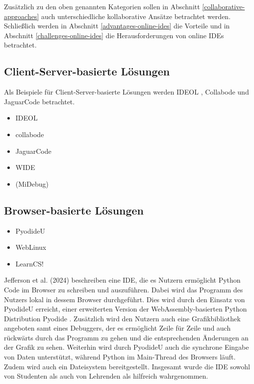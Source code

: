 Zusätzlich zu den oben genannten Kategorien sollen in Abschnitt \ref{collaborative-approaches} auch unterschiedliche kollaborative Ansätze betrachtet werden. Schließlich werden in Abschnitt \ref{advantages-online-ides} die Vorteile und in Abschnitt \ref{challenges-online-ides} die Herausforderungen von online IDEs betrachtet.

\subsection{Client-Server-basierte Lösungen} \label{client-server-based-approaches}

Als Beispiele für Client-Server-basierte Lösungen werden IDEOL \cite{IDEOL-2013}, Collabode \cite{Collabode-2011} und JaguarCode \cite{JaguarCode-2018} betrachtet.

\begin{itemize}
    \item IDEOL
    \item collabode
    \item JaguarCode
    \item WIDE
    \item (MiDebug)
\end{itemize}

\subsection{Browser-basierte Lösungen} \label{browser-based-approaches}

\begin{itemize}
    \item PyodideU
    \item WebLinux
    \item LearnCS!
\end{itemize}

Jefferson et al. (2024) \cite{PyodideU-2024} beschreiben eine IDE, die es Nutzern ermöglicht Python Code im Browser zu schreiben und auszuführen. Dabei wird das Programm des Nutzers lokal in dessem Browser durchgeführt. Dies wird durch den Einsatz von PyodideU erreicht, einer erweiterten Version der WebAssembly-basierten Python Distribution Pyodide \cite{Pyodide}. Zusätzlich wird den Nutzern auch eine Grafikbibliothek angeboten samt eines Debuggers, der es ermöglicht Zeile für Zeile und auch rückwärts durch das Programm zu gehen und die entsprechenden Änderungen an der Grafik zu sehen. Weiterhin wird durch PyodideU auch die synchrone Eingabe von Daten unterstützt, während Python im Main-Thread des Browsers läuft. Zudem wird auch ein Dateisystem bereitgestellt. Insgesamt wurde die IDE sowohl von Studenten als auch von Lehrenden als hilfreich wahrgenommen.

